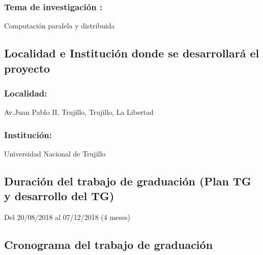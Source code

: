     \subsubsection{Tema de investigación :}
    Computación paralela y distribuida


\subsection{Localidad e Institución donde se desarrollará el proyecto }
  
    \subsubsection{Localidad:} 
    Av.Juan Pablo II, Trujillo, Trujillo, La Libertad

    \subsubsection{Institución:}
    Universidad Nacional de Trujillo

\subsection{Duración del trabajo de graduación (Plan TG y desarrollo del TG)}
Del 20/08/2018 al 07/12/2018 (4 meses)

\subsection{Cronograma del trabajo de graduación}

